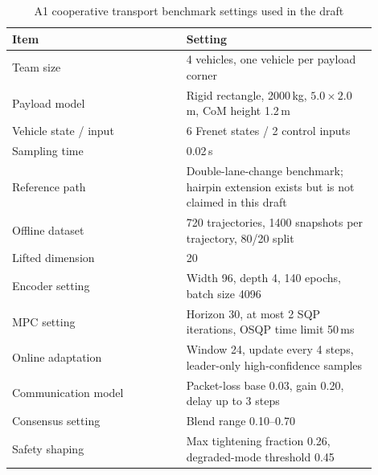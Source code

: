 \documentclass[twocolumn,3p,times,procedia]{elsarticle}
\begin{document}
\begin{table}[h]
\footnotesize
\centering
\begin{threeparttable}
\setlength{\abovecaptionskip}{0pt}
\caption{A1 cooperative transport benchmark settings used in the draft}
\label{tab:settings}
\begin{tabular}{p{0.43\linewidth} p{0.47\linewidth}}
\toprule
Item & Setting \\
\midrule
Team size & 4 vehicles, one vehicle per payload corner \\
Payload model & Rigid rectangle, 2000\,kg, $5.0\times2.0$\,m, CoM height 1.2\,m \\
Vehicle state / input & 6 Frenet states / 2 control inputs \\
Sampling time & 0.02\,s \\
Reference path & Double-lane-change benchmark; hairpin extension exists but is not claimed in this draft \\
Offline dataset & 720 trajectories, 1400 snapshots per trajectory, 80/20 split \\
Lifted dimension & 20 \\
Encoder setting & Width 96, depth 4, 140 epochs, batch size 4096 \\
MPC setting & Horizon 30, at most 2 SQP iterations, OSQP time limit 50\,ms \\
Online adaptation & Window 24, update every 4 steps, leader-only high-confidence samples \\
Communication model & Packet-loss base 0.03, gain 0.20, delay up to 3 steps \\
Consensus setting & Blend range 0.10--0.70 \\
Safety shaping & Max tightening fraction 0.26, degraded-mode threshold 0.45 \\
\bottomrule
\end{tabular}
\end{threeparttable}
\end{table}
\end{document}
